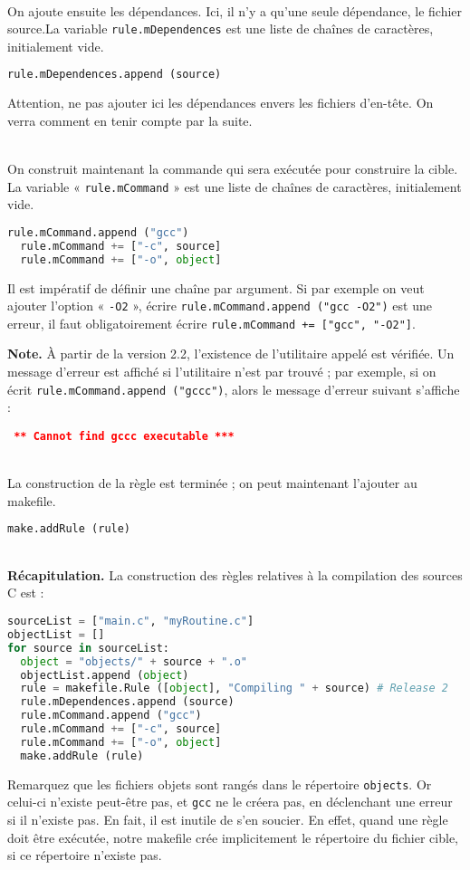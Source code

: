 \documentclass[a4paper,11pt]{extarticle}
\begin{document}
~\\On ajoute ensuite les dépendances. Ici, il n'y a qu'une seule dépendance, le fichier source.La variable \texttt{rule.mDependences} est une liste de chaînes de caractères, initialement vide.
\begin{lstlisting}[language=py]
  rule.mDependences.append (source)
\end{lstlisting}
Attention, ne pas ajouter ici les dépendances envers les fichiers d'en-tête. On verra comment en tenir compte par la suite.

~\\On construit maintenant la commande qui sera exécutée pour construire la cible. La variable « \texttt{rule.mCommand} » est une liste de chaînes de caractères, initialement vide.
\begin{lstlisting}[language=py]
  rule.mCommand.append ("gcc")
  rule.mCommand += ["-c", source]
  rule.mCommand += ["-o", object]
\end{lstlisting}
Il est impératif de définir une chaîne par argument. Si par exemple on veut ajouter l'option « \texttt{-O2} », écrire \texttt{rule.mCommand.append ("gcc -O2")} est une erreur, il faut obligatoirement écrire \texttt{rule.mCommand += ["gcc", "-O2"]}.

{\bf Note.}\label{verifUtilitaire} À partir de la version 2.2, l'existence de l'utilitaire appelé est vérifiée. Un message d'erreur est affiché si l'utilitaire n'est par trouvé ; par exemple, si on écrit \texttt{rule.mCommand.append ("gccc")}, alors le message d'erreur suivant s'affiche :
\begin{mdframed}[hidealllines=true,backgroundcolor=lightgray!20]
\tt\footnotesize
\textcolor{red}{\bf*** Cannot find~\textquotesingle gccc\textquotesingle~executable ***}
\end{mdframed}

~\\La construction de la règle est terminée ; on peut maintenant l'ajouter au makefile.
\begin{lstlisting}[language=py]
  make.addRule (rule)
\end{lstlisting}


~\\{\bf Récapitulation.} La construction des règles relatives à la compilation des sources C est :
\begin{lstlisting}[language=py]
sourceList = ["main.c", "myRoutine.c"]
objectList = []
for source in sourceList:
  object = "objects/" + source + ".o"
  objectList.append (object)
  rule = makefile.Rule ([object], "Compiling " + source) # Release 2
  rule.mDependences.append (source)
  rule.mCommand.append ("gcc")
  rule.mCommand += ["-c", source]
  rule.mCommand += ["-o", object]
  make.addRule (rule)
\end{lstlisting}
Remarquez que les fichiers objets sont rangés dans le répertoire \texttt{objects}. Or celui-ci n'existe peut-être pas, et \texttt{gcc} ne le créera pas, en déclenchant une erreur si il n'existe pas. En fait, il est inutile de s'en soucier. En effet, quand une règle doit être exécutée, notre makefile crée implicitement le répertoire du fichier cible, si ce répertoire n'existe pas.
\end{document}
